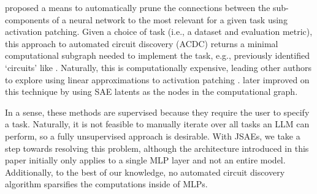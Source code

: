 \citet{conmy_automated_2023} proposed a means to automatically prune the connections between the sub-components of a neural network to the most relevant for a given task using activation patching.
Given a choice of task (i.e., a dataset and evaluation metric), this approach to automated circuit discovery (ACDC) returns a minimal computational subgraph needed to implement the task, e.g., previously identified `circuits' like \citet{hanna_how_2023}.
Naturally, this is computationally expensive, leading other authors to explore using linear approximations to activation patching \citep{nanda_attribution_2023,syed_attribution_2024,atpstar}.
\citet{marks_sparse_2024} later improved on this technique by using SAE latents as the nodes in the computational graph.

In a sense, these methods are supervised because they require the user to specify a task.
Naturally, it is not feasible to manually iterate over all tasks an LLM can perform, so a fully unsupervised approach is desirable.
With JSAEs, we take a step towards resolving this problem, although the architecture introduced in this paper initially only applies to a single MLP layer and not an entire model.
Additionally, to the best of our knowledge, no automated circuit discovery algorithm sparsifies the computations inside of MLPs.

%